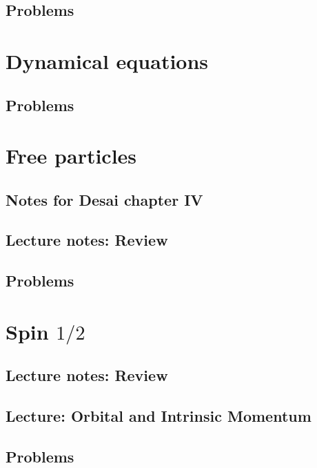       \section{Problems}
         
         
         

   \chapter{Dynamical equations}
      
      \section{Problems}
         

   \chapter{Free particles}
      \section{Notes for Desai chapter IV}
         
      \section{Lecture notes: Review}
         
      \section{Problems}
         

   \chapter{Spin $1/2$}
      \section{Lecture notes: Review}
         
      \section{Lecture: Orbital and Intrinsic Momentum}
         
      \section{Problems}
         
         

